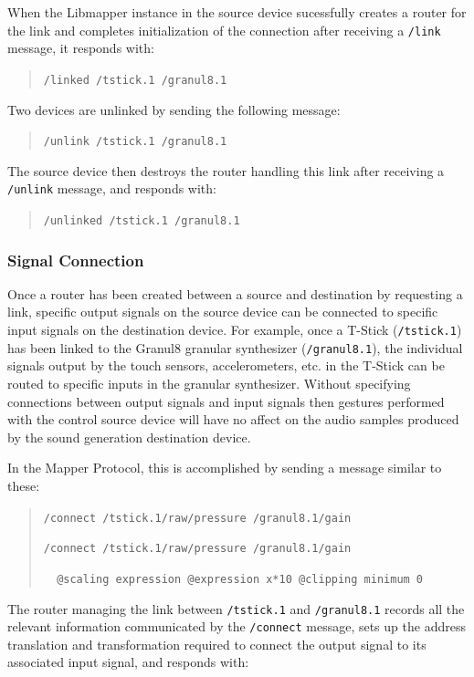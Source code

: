 When the Libmapper instance in the source device sucessfully creates a router for the link and completes initialization of the connection after receiving a \verb#/link# message, it responds with:

\begin{quote}
\verb#/linked /tstick.1 /granul8.1#
\end{quote}

Two devices are unlinked by sending the following message:

\begin{quote}
\verb#/unlink /tstick.1 /granul8.1#
\end{quote}

The source device then destroys the router handling this link after receiving a \verb#/unlink# message, and responds with:

\begin{quote}
\verb#/unlinked /tstick.1 /granul8.1#
\end{quote}

\subsubsection{Signal Connection}

Once a router has been created between a source and destination by requesting a link, specific output signals on the source device can be connected to specific input signals on the destination device. For example, once a T-Stick (\verb#/tstick.1#) has been linked to the Granul8 granular synthesizer (\verb#/granul8.1#), the individual signals output by the touch sensors, accelerometers, etc. in the T-Stick can be routed to specific inputs in the granular synthesizer. Without specifying connections between output signals and input signals then gestures performed with the control source device will have no affect on the audio samples produced by the sound generation destination device. 

In the Mapper Protocol, this is accomplished by sending a message similar to these:

\begin{quote}
\verb#/connect /tstick.1/raw/pressure /granul8.1/gain#

\verb#/connect /tstick.1/raw/pressure /granul8.1/gain#

\verb#  @scaling expression @expression x*10 @clipping minimum 0#
\end{quote}

The router managing the link between \verb#/tstick.1# and \verb#/granul8.1# records all the relevant information communicated by the \verb#/connect# message, sets up the address translation and transformation required to connect the output signal to its associated input signal, and responds with:

